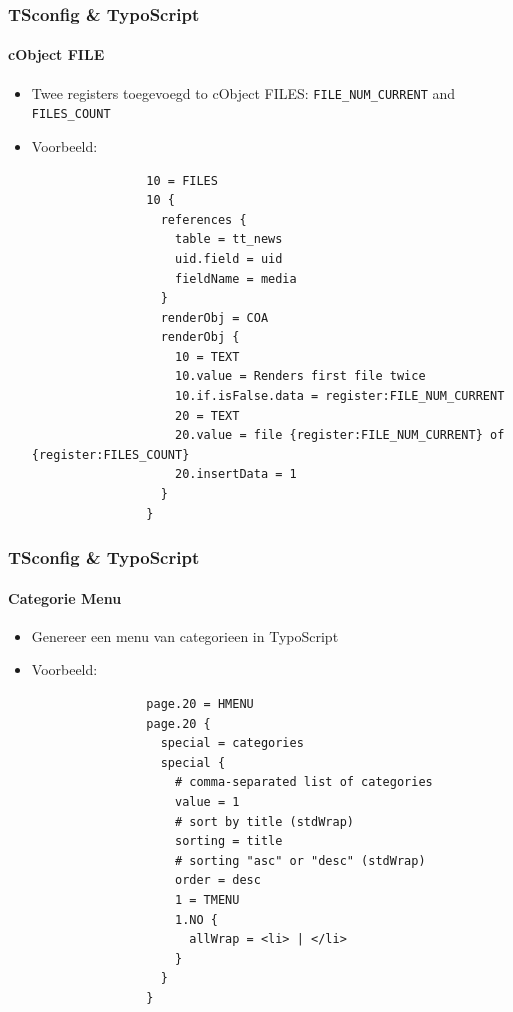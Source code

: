 
\begin{frame}[fragile]
	\frametitle{TSconfig \& TypoScript}
	\framesubtitle{cObject FILE}

	\begin{itemize}
		\item Twee registers toegevoegd to cObject FILES:\newline
			\texttt{FILE\_NUM\_CURRENT} and \texttt{FILES\_COUNT}

		\item Voorbeeld:

			\lstset{
				basicstyle=\tiny\ttfamily
			}

			\begin{lstlisting}
				10 = FILES
				10 {
				  references {
				    table = tt_news
				    uid.field = uid
				    fieldName = media
				  }
				  renderObj = COA
				  renderObj {
				    10 = TEXT
				    10.value = Renders first file twice
				    10.if.isFalse.data = register:FILE_NUM_CURRENT
				    20 = TEXT
				    20.value = file {register:FILE_NUM_CURRENT} of {register:FILES_COUNT}
				    20.insertData = 1
				  }
				}
			\end{lstlisting}

	\end{itemize}

\end{frame}


\begin{frame}[fragile]
	\frametitle{TSconfig \& TypoScript}
	\framesubtitle{Categorie Menu}

	\begin{itemize}
		\item Genereer een menu van categorieen in TypoScript

		\item Voorbeeld:

			\lstset{
				basicstyle=\tiny\ttfamily
			}

			\begin{lstlisting}
				page.20 = HMENU
				page.20 {
				  special = categories
				  special {
				    # comma-separated list of categories
				    value = 1
				    # sort by title (stdWrap)
				    sorting = title
				    # sorting "asc" or "desc" (stdWrap)
				    order = desc
				    1 = TMENU
				    1.NO {
				      allWrap = <li> | </li>
				    }
				  }
				}
			\end{lstlisting}

	\end{itemize}

\end{frame}

